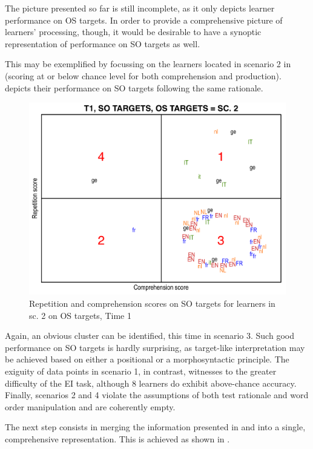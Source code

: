 The picture presented so far is still incomplete, as it only depicts learner performance on OS targets. In order to provide a comprehensive picture of learners' processing, though, it would be desirable to have a synoptic representation of performance on SO targets as well. 

This may be exemplified by focussing on the learners located in scenario 2 in  (scoring at or below chance level for both comprehension and production).  depicts their performance on SO targets following the same rationale. 

\begin{figure}
    \includegraphics[width=\textwidth]{figures/06-3.pdf}
    \caption{Repetition and comprehension scores on SO targets for learners in sc. 2 on OS targets, Time 1}
    \label{fig:06:3}
\end{figure}

Again, an obvious cluster can be identified, this time in scenario 3. Such good performance on SO targets is hardly surprising, as target-like interpretation may be achieved based on either a positional or a morphosyntactic principle. The exiguity of data points in scenario 1, in contrast, witnesses to the greater difficulty of the EI task, although 8 learners do exhibit above-chance accuracy. Finally, scenarios 2 and 4 violate the assumptions of both test rationale and word order manipulation and are coherently empty.

The next step consists in merging the information presented in  and  into a single, comprehensive representation. This is achieved as shown in .

